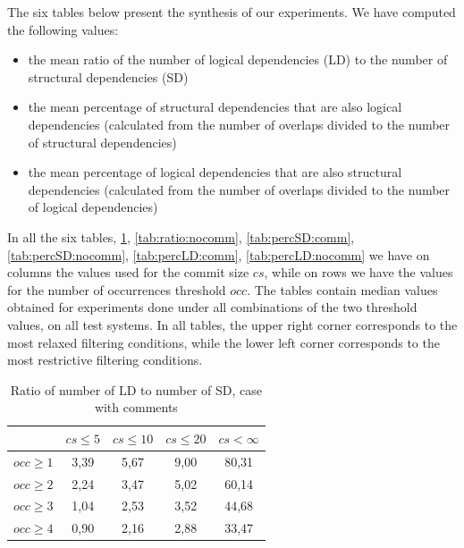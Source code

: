 \documentclass[12pt]{mitthesis}
\begin{document}
The six tables below present the synthesis of our experiments. 
We have computed the following  values:
\begin{itemize}
	\item the mean ratio of the number of logical dependencies  (LD) to the number of structural dependencies (SD)
   \item the mean percentage of structural dependencies that are also logical dependencies (calculated from the number of overlaps divided to the number of structural dependencies)	
		\item the mean percentage of logical dependencies that are also structural dependencies (calculated from the number of overlaps divided to the number of logical dependencies)
\end{itemize}

In all the six tables, \ref{tab:ratio:comm}, \ref{tab:ratio:nocomm}, \ref{tab:percSD:comm}, \ref{tab:percSD:nocomm},
\ref{tab:percLD:comm}, \ref{tab:percLD:nocomm} we have on columns the values used for the commit size $cs$, while on rows we have the values for the number of occurrences threshold $occ$. The tables contain median values obtained for experiments done under all combinations of the two threshold values, on all test systems. In all tables, the upper right corner corresponds to the most relaxed filtering conditions, while the lower left corner corresponds to the most restrictive filtering conditions.

\begin{table}[!h]
\renewcommand{\arraystretch}{1}
\caption{Ratio of number of LD to number of SD, case with comments}
\label{tab:ratio:comm}
\centering

\begin{tabular}{|c|c|c|c|c|}
\hline
	      &	$cs\leq 5$	&	$cs\leq 10$	&	$cs\leq 20$	&	$cs<\infty$	\\
\hline
$occ\geq 1$	&	3,39	&	5,67	&	9,00	&	80,31	\\
$occ\geq 2$	&	2,24	&	3,47	&	5,02	&	60,14	\\
$occ\geq 3$	&	1,04	&	2,53	&	3,52	&	44,68	\\
$occ\geq 4$	&	0,90	&	2,16	&	2,88	&	33,47	\\
\hline
\end{tabular}
\end{table}
\end{document}
